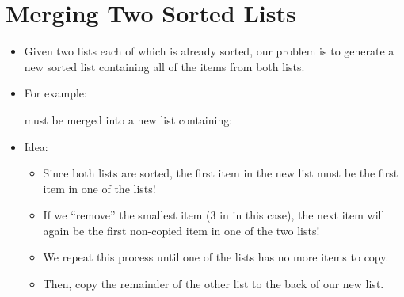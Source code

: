 \documentclass[letterpaper,10pt,english]{sphinxmanual}
\begin{document}
\section{Merging Two Sorted Lists}
\label{\detokenize{lecture_notes/lec21_sorting:merging-two-sorted-lists}}\begin{itemize}
\item {} 
Given two lists each of which is already sorted, our problem is to
generate a new sorted list containing all of the items from both
lists.

\item {} 
For example:

\begin{sphinxVerbatim}[commandchars=\\\{\}]
  \PYG{p}{[}   \PYG{p}{]}
  \PYG{p}{[}    \PYG{p}{]}
\end{sphinxVerbatim}

must be merged into a new list containing:

\begin{sphinxVerbatim}[commandchars=\\\{\}]
\PYG{p}{[}        \PYG{p}{]}
\end{sphinxVerbatim}

\item {} 
Idea:
\begin{itemize}
\item {} 
Since both lists are sorted, the first item in the new list must
be the first item in one of the lists!

\item {} 
If we “remove” the smallest item (3 in  in this case), the
next item will again be the first non-copied item in one of the
two lists!

\item {} 
We repeat this process until one of the lists has no more items to
copy.

\item {} 
Then, copy the remainder of the other list to the back of our new
list.


\end{itemize}
\end{itemize}
\end{document}
